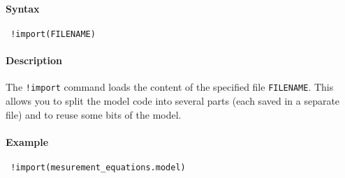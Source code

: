 


	\paragraph{Syntax}
 
 \begin{verbatim}
 !import(FILENAME)
 \end{verbatim}
 
 \paragraph{Description}
 
 The \texttt{!import} command loads the content of the specified file
 \texttt{FILENAME}. This allows you to split the model code into several
 parts (each saved in a separate file) and to reuse some bits of the
 model.
 
 \paragraph{Example}
 
 \begin{verbatim}
 !import(mesurement_equations.model)
 \end{verbatim}


